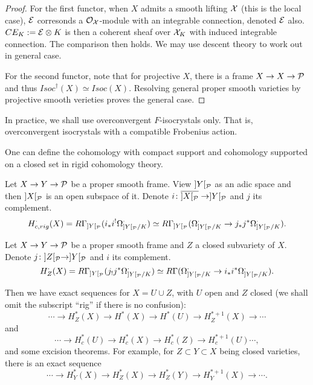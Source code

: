 \begin{proof}
    For the first functor, when $X$ admits a smooth lifting ${\mathcal {X}}$ (this is the local case), 
    ${\mathcal {E}}$ corresonds a ${\mathcal {O}}_{{\mathcal {X}}}$-module with an integrable connection, denoted ${\mathcal {E}}$ also. 
    $CE_K := {\mathcal {E}} \otimes K$ is then a coherent sheaf 
    over ${\mathcal {X}}_K$ with induced integrable connection. 
    The comparison then holds. 
    We may use descent theory to work out in general case.

    For the second functor, note that for projective $X$, 
    there is a frame $X \to X \to {\mathcal {P}}$ and thus $Isoc^\dagger(X) \simeq Isoc(X)$. 
    Resolving general proper smooth varieties 
    by projective smooth verieties proves the general case. 
\end{proof}

\begin{remark}
    In practice, we shall use overconvergent $F$-isocrystals only. 
    That is, overconvergent isocrystals with a compatible Frobenius action.
\end{remark}

One can define the cohomology with compact support and cohomology 
supported on a closed set in rigid cohomology theory.
\begin{definition}
    Let $X \to Y \to {\mathcal {P}}$ be a proper smooth frame. 
    View $]Y[_{\mathcal {P}}$ as an adic space and then $]X[_{\mathcal {P}}$ is an open subspace of it. 
    Denote $i\colon \overline{]X[_{\mathcal {P}}} \to ]Y[_{\mathcal {P}}$ and $j$ its complement.
    \[
        H^\cdot_{c,rig}(X) = R\Gamma_{]Y[_{\mathcal {P}}} (i_*i^! \Omega_{]Y[_{\mathcal {P}}/K}^\cdot) 
        \simeq R\Gamma_{]Y[_{\mathcal {P}}} (\Omega_{]Y[_{\mathcal {P}}/K}^\cdot \to j_*j^*\Omega_{]Y[_{\mathcal {P}}/K}^\cdot).
    \]
\end{definition}

\begin{definition}
    Let $X \to Y \to {\mathcal {P}}$ be a proper smooth frame and $Z$ a closed subvariety of $X$. 
    Denote $j \colon ]Z[_{\mathcal {P}} \to ]Y[_{\mathcal {P}}$ and $i$ its complement.
    \[
        H^\cdot_Z(X) = R\Gamma_{]Y[_{\mathcal {P}}} (j_! j^* \Omega_{]Y[_{\mathcal {P}}/K}^\cdot) 
        \simeq R\Gamma(\Omega_{]Y[_{\mathcal {P}}/K}^\cdot \to i_*i^* \Omega_{]Y[_{\mathcal {P}}/K}^\cdot).
    \]
\end{definition}

Then we have exact sequences for $X=U\cup Z$, 
with $U$ open and $Z$ closed 
(we shall omit the subscript ``rig'' if there is no confusion):
\[
    \cdots \to H^*_Z(X) \to H^*(X) \to H^*(U) \to H^{*+1}_Z(X) \to \cdots
\]
and 
\[
    \cdots \to H^*_c(U) \to H^*_c(X) \to H^*_c(Z) \to H^{*+1}_c(U) \cdots,
\]
and some excision theorems. 
For example, for $Z \subset Y \subset X$ being closed varieties, 
there is an exact sequence
\[
    \cdots \to H^*_Y(X) \to H^*_Z(X) \to H^*_Z(Y) \to H^{*+1}_Y(X) \to \cdots.
\]

